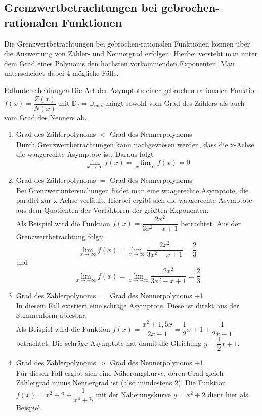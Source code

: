\subsection{Grenzwertbetrachtungen bei gebrochen-rationalen Funktionen}  \label{Fallgebrochenrational}
Die Grenzwertbetrachtungen bei gebrochen-rationalen Funktionen können über die Auswertung von Zähler- und Nennergrad erfolgen. Hierbei versteht man unter dem Grad eines Polynoms den höchsten vorkommenden Exponenten. Man unterscheidet dabei 4 mögliche Fälle.
\begin{merke}{Fallunterscheidungen}{}
Die Art der Asymptote einer gebrochen-rationalen Funktion $f(x)=\dfrac{Z(x)}{N(x)}$ mit $\mathds{D}_f = \mathds{D}_{\text{max}}$ hängt sowohl vom Grad des Zählers als auch vom Grad des Nenners ab.
\begin{enumerate}
    \item Grad des Zählerpolynoms $<$ Grad des Nennerpolynoms\\
    Durch Grenzwertbetrachtungen kann nachgewiesen werden, dass die x-Achse die waagerechte Asymptote ist. Daraus folgt $$\lim_{x\longrightarrow \infty} f(x) = \lim_{x\longrightarrow -\infty} f(x) = 0$$
\item  Grad des Zählerpolynoms $=$ Grad des Nennerpolynoms\\ Bei Grenzwertuntersuchungen findet man eine waagerechte Asymptote, die parallel zur x-Achse verläuft. Hierbei ergibt sich die waagerechte Asymptote aus dem Quotienten der Vorfaktoren der größten Exponenten.\\ Als Beispiel wird die Funktion $f(x)= \dfrac{2x^2}{3x^2-x+1}$ betrachtet. Aus der Grenzwertbetrachtung folgt: $$\lim_{x\longrightarrow \infty} f(x) = \lim_{x\longrightarrow \infty} \dfrac{2x^2}{3x^2-x+1} = \dfrac{2}{3}$$ und $$\lim_{x\longrightarrow -\infty} f(x) = \lim_{x\longrightarrow -\infty} \dfrac{2x^2}{3x^2-x+1} = \dfrac{2}{3}$$
\item Grad des Zählerpolynoms $=$ Grad des Nennerpolynoms +1\\
In diesem Fall existiert eine schräge Asymptote. Diese ist direkt aus der Summenform ablesbar. \\ Als Beispiel wird die Funktion $f(x)= \dfrac{x^2+1,5x}{2x-1} = \dfrac{1}{2}x+1+\dfrac{1}{2x-1}$ betrachtet. Die schräge Asymptote hat damit die Gleichung $y= \dfrac{1}{2}x+1$.
\item Grad des Zählerpolynoms $>$ Grad des Nennerpolynoms +1\\
Für diesen Fall ergibt sich eine Näherungskurve, deren Grad gleich Zählergrad minus Nennergrad ist (also mindestens 2). Die Funktion\\ $f(x) = x^2+2+\dfrac{1}{x^4+5}$ mit der Näherungskurve $y= x^2+2$ dient hier als Beispiel.
\end{enumerate}
\end{merke}
